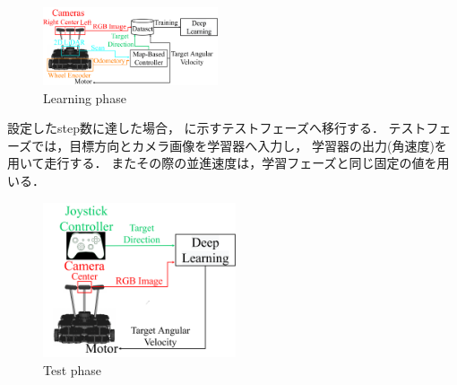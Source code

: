 \documentclass[10pt]{jarticle}
\begin{document}
    \begin{center}
        \begin{figure}[h]
            \centering
            \includegraphics[width=0.46\textwidth]{./fig/system_learning.pdf}
            \caption{Learning phase}
            \label{fig:system_learning}
        \end{figure}
    \end{center}
    
    設定したstep数に達した場合，
    に示すテストフェーズへ移行する．
    テストフェーズでは，目標方向とカメラ画像を学習器へ入力し，
    学習器の出力(角速度)を用いて走行する．
    またその際の並進速度は，学習フェーズと同じ固定の値を用いる．
    \begin{center}
        \begin{figure}[h]
            \centering
            \includegraphics[width=5.7cm]{./fig/system_test.pdf}
            \caption{Test phase}
            \label{fig:system_test}
        \end{figure}
    \end{center}
    \vspace{-1zh}
\end{document}
